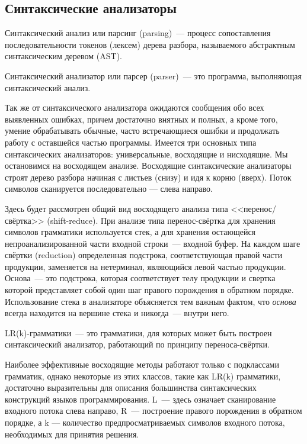 \label{sec:relatedworks}

\subsection{Синтаксические анализаторы}
Синтаксический анализ или парсинг (parsing)~--- процесс сопоставления последовательности токенов (лексем) дерева разбора, называемого абстрактным синтаксическим деревом (AST).

Синтаксический анализатор или парсер (parser)~--- это программа, выполняющая синтаксический анализ.

Так же от синтаксического анализатора ожидаются сообщения обо всех выявленных ошибках, причем достаточно внятных и полных, а кроме того, умение обрабатывать обычные, часто встречающиеся ошибки и продолжать работу с оставшейся частью программы.
Имеется три основных типа синтаксических анализаторов: универсальные, восходящие и нисходящие\cite{DB}. Мы остановимся на восходящем анализе. Восходящие синтаксические анализаторы строят дерево разбора начиная с листьев (снизу) и идя к корню (вверх). Поток символов сканируется последовательно --- слева направо.

Здесь будет рассмотрен общий вид восходящего анализа типа <<перенос/свёртка>> (shift-reduce). При анализе типа перенос-свёртка для хранения символов грамматики используется стек, а для хранения остающейся непроанализированной части входной строки~--- входной буфер. На каждом шаге свёртки (reduction) определенная подстрока, соответствующая правой части продукции, заменяется на нетерминал, являющийся левой частью продукции. Основа~--- это подстрока, которая соответствует телу продукции и свертка которой представляет собой один шаг правого порождения в обратном порядке. Использование стека в анализаторе объясняется тем важным фактом, что {\it основа} всегда находится на вершине стека и никогда~--- внутри него.

LR(k)-грамматики~--- это грамматики, для которых может быть построен синтаксический анализатор, работающий по принципу переноса-свёртки.

Наиболее эффективные восходящие методы работают только с подклассами грамматик, однако некоторые из этих классов, такие как LR(k) грамматики, достаточно выразительны для описания большинства синтаксических конструкций языков программирования.
L~--- здесь означает сканирование входного потока слева направо, R~--- построение правого порождения в обратном порядке, а k --- количество предпросматриваемых символов входного потока, необходимых для принятия решения. 

